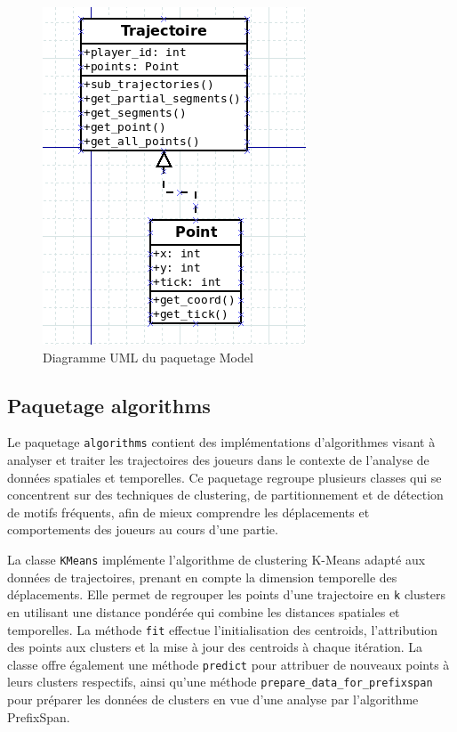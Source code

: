 \documentclass{article}
\begin{document}
        \begin{figure}[H]
                \centering
                \includegraphics[scale=0.40]{img/model.png}
                \caption{Diagramme UML du paquetage Model}
                \label{Diagramme_model}
        \end{figure}

        \subsection{Paquetage algorithms}    

        Le paquetage \texttt{algorithms} contient des implémentations d'algorithmes visant à analyser et traiter les trajectoires des joueurs dans le contexte de l'analyse de données spatiales et temporelles. Ce paquetage regroupe plusieurs classes qui se concentrent sur des techniques de clustering, de partitionnement et de détection de motifs fréquents, afin de mieux comprendre les déplacements et comportements des joueurs au cours d'une partie.
    
        La classe \texttt{KMeans} implémente l'algorithme de clustering K-Means adapté aux données de trajectoires, prenant en compte la dimension temporelle des déplacements. Elle permet de regrouper les points d'une trajectoire en \texttt{k} clusters en utilisant une distance pondérée qui combine les distances spatiales et temporelles. La méthode \texttt{fit} effectue l'initialisation des centroids, l'attribution des points aux clusters et la mise à jour des centroids à chaque itération. La classe offre également une méthode \texttt{predict} pour attribuer de nouveaux points à leurs clusters respectifs, ainsi qu'une méthode \texttt{prepare\_data\_for\_prefixspan} pour préparer les données de clusters en vue d'une analyse par l'algorithme PrefixSpan.
    
\end{document}
